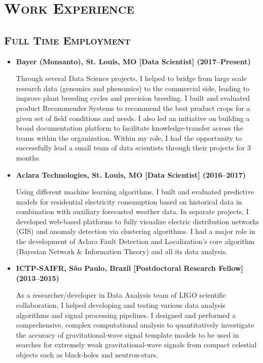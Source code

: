 \documentclass[10pt,a4paper]{moderncv}
\begin{document}
\section{\textsc{Work Experience}}
\subsection{\textsc{Full Time Employment}}

\begin{itemize}
\item \textbf{Bayer (Monsanto), St. Louis, MO [Data Scientist] (2017--Present)}

Through several Data Science projects, I helped to bridge from large scale research data (genomics and phenomics) to the commercial side, leading to improve plant breeding cycles and precision breeding. I built and evaluated product Recommender Systems to recommend the best product crops for a given set of field conditions and needs. I also led an initiative on building a broad documentation platform to facilitate knowledge-transfer across the teams within the organization. Within my role, I had the opportunity to successfully lead a small team of data scientists through their projects for 3 months.
\vspace{.2cm}

\item \textbf{Aclara Technologies, St. Louis, MO [Data Scientist] (2016--2017)}

	Using different machine learning algorithms, I built and evaluated predictive models for residential electricity consumption based on historical data in combination with auxiliary forecasted weather data. In separate projects, I developed web-based platforms to fully visualize electric distribution networks (GIS) and anomaly detection via clustering algorithms. I had a major role in the development of Aclara Fault Detection and Localization's core algorithm (Bayesian Network \& Information Theory) and all its data analysis.
\vspace{.2cm}

\item \textbf{ICTP-SAIFR, S\~{a}o Paulo, Brazil [Postdoctoral Research Fellow] (2013--2015)}

	As a researcher/developer in Data Analysis team of LIGO scientific collaboration, I helped developing and testing various data analysis algorithms and signal processing pipelines. I designed and performed a comprehensive, complex computational analysis to quantitatively investigate the accuracy of gravitational-wave signal template models to be used in searches for extremely weak gravitational-wave signals from compact celestial objects such as black-holes and neutron-stars.


\end{itemize}
\end{document}

